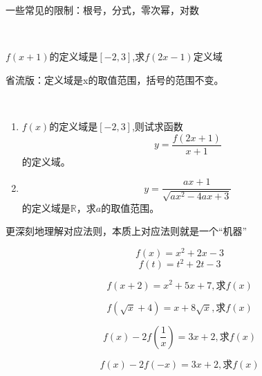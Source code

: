 一些常见的限制：根号，分式，零次幂，对数
\begin{definition}[复合函数]
    
\end{definition}
\begin{example}
    \ 

    $f(x+1)$的定义域是$[-2,3]$,求$f(2x-1)$定义域
\end{example}

省流版：定义域是x的取值范围，括号的范围不变。
\begin{exercise}
    \ 

    \begin{enumerate}
        \item  $f(x)$的定义域是$[-2,3]$,则试求函数\[y=\frac{f(2x+1)}{x+1}\]的定义域。
       \item \[y=\frac{ax+1}{\sqrt{ax^2-4ax+3}}\]的定义域是$\mathbb{R}$，求$a$的取值范围。
    \end{enumerate}
   
\end{exercise}



更深刻地理解对应法则，本质上对应法则就是一个“机器”

\begin{example}
    \begin{equation}
        f(x)=x^2+2x-3
    \end{equation}
    \begin{equation}
        f(t)=t^2+2t-3
    \end{equation}
\end{example}
\begin{example}
    \[f(x+2)=x^2+5x+7,\text{求}f(x)\]
\end{example}
\begin{exercise}
    \[f(\sqrt{x}+4)=x+8\sqrt{x},\text{求}f(x)\]
\end{exercise}
\begin{example}
    \[f(x)-2f(\frac{1}{x})=3x+2,\text{求}f(x)\]
\end{example}
\begin{exercise}
    \[f(x)-2f(-x)=3x+2,\text{求}f(x)\]
\end{exercise}

